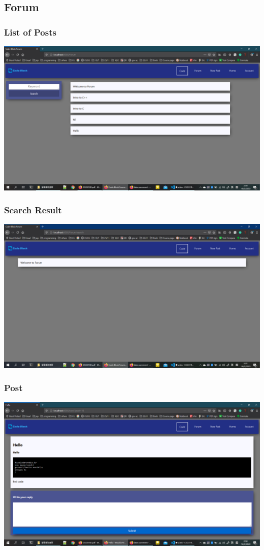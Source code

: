 \subsection{Forum}
\subsubsection{List of Posts}
\includegraphics[scale=0.4]{Doc/Pics/post_list.png}

\subsubsection{Search Result}
\includegraphics[scale=0.4]{Doc/Pics/search_result.png}

\subsubsection{Post}
\includegraphics[scale=0.4]{Doc/Pics/post.png}

